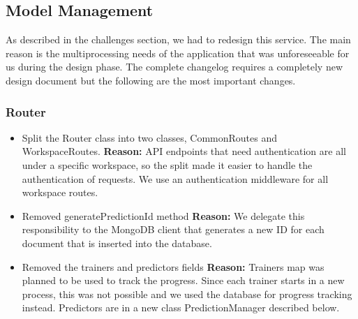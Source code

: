 \subsection{Model Management}
As described in the challenges section, we had to redesign this service. The main
reason is the multiprocessing needs of the application that was unforeseeable for
us during the design phase. The complete changelog requires a completely new design
document but the following are the most important changes.

\subsubsection{Router}
\begin{itemize}
    \item 
    Split the Router class into two classes, CommonRoutes and WorkspaceRoutes.
    \newline
    \textbf{Reason:} API endpoints that need authentication are all under
    a specific workspace, so the split made it easier to handle the authentication
    of requests. We use an authentication middleware for all workspace routes. 
    \item
    Removed generatePredictionId method
    \newline
    \textbf{Reason:} We delegate this responsibility to the MongoDB client that
    generates a new ID for each document that is inserted into the database.
    \item
    Removed the trainers and predictors fields
    \newline
    \textbf{Reason:} Trainers map was planned to be used to track the progress.
    Since each trainer starts in a new process, this was not possible and we used
    the database for progress tracking instead. Predictors are in a new class
    PredictionManager described below.
\end{itemize}

